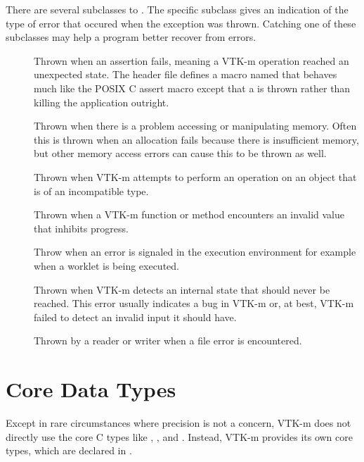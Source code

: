
There are several subclasses to . The specific subclass
gives an indication of the type of error that occured when the exception
was thrown. Catching one of these subclasses may help a program better
recover from errors.
\begin{description}
\item[]  
  Thrown when an assertion fails, meaning a VTK-m operation reached an
  unexpected state. The header file 
  defines a macro named  that behaves much
  like the POSIX C assert macro except that a
   is thrown rather than killing the
  application outright.
\item[] Thrown when there is a problem
  accessing or manipulating memory. Often this is thrown when an allocation
  fails because there is insufficient memory, but other memory access
  errors can cause this to be thrown as well.
\item[] Thrown when VTK-m attempts to perform
  an operation on an object that is of an incompatible type.
\item[] Thrown when a VTK-m function or
  method encounters an invalid value that inhibits progress.
\item[]  Throw
  when an error is signaled in the execution environment for example when a
  worklet is being executed.
\item[] Thrown when VTK-m detects an
  internal state that should never be reached. This error usually indicates
  a bug in VTK-m or, at best, VTK-m failed to detect an invalid input it
  should have.
\item[] Thrown by a reader or writer when a file error is
  encountered.
\end{description}



\section{Core Data Types}
\label{sec:CoreDataTypes}

Except in rare circumstances where precision is not a concern, VTK-m does
not directly use the core C types like , ,
and . Instead, VTK-m provides its own core types, which
are declared in .

